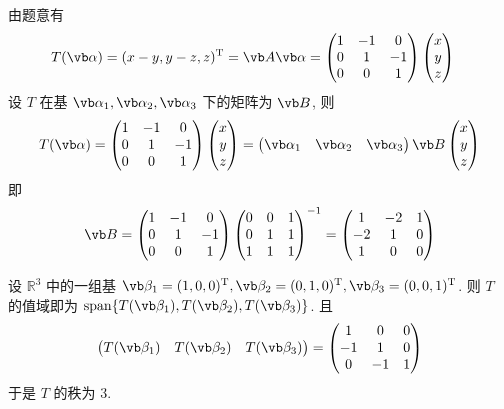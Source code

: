 由题意有
\[
\begin{aligned}
T(\vb\alpha)=(x-y,y-z,z)^{\mathrm T}&=\vb A\vb\alpha=\begin{pmatrix}1&-1&0\\ 0&1&-1\\ 0&0&1\end{pmatrix}\begin{pmatrix}x\\y\\z\end{pmatrix}
\end{aligned}
\]
设 $T$ 在基 $\vb\alpha_1,\vb\alpha_2,\vb\alpha_3$ 下的矩阵为 $\vb B$, 则
\[
	\begin{aligned}
T(\vb\alpha)=\begin{pmatrix}1&-1&0\\ 0&1&-1\\ 0&0&1\end{pmatrix}\begin{pmatrix}x\\y\\z\end{pmatrix}=\begin{pmatrix}\vb\alpha_1&\vb\alpha_2&\vb\alpha_3\end{pmatrix}\vb B\begin{pmatrix}x\\y\\z\end{pmatrix}
	\end{aligned}
\]
即
\[
	\vb B=\begin{pmatrix}1&-1&0\\ 0&1&-1\\ 0&0&1\end{pmatrix}\begin{pmatrix}0&0&1\\ 0&1&1\\ 1&1&1\end{pmatrix}^{-1}=\begin{pmatrix}1&-2&1\\ -2&1&0\\ 1&0&0\end{pmatrix}
\]

设 $\mathbb{R}^3$ 中的一组基 $\vb\beta_1=(1,0,0)^{\mathrm T},\vb\beta_2=(0,1,0)^{\mathrm T},\vb\beta_3=(0,0,1)^{\mathrm T}$. 则 $T$ 的值域即为 $\mathrm{span}\{T(\vb\beta_1),T(\vb\beta_2),T(\vb\beta_3)\}$. 且
\[
	\begin{pmatrix}T(\vb\beta_1)&T(\vb\beta_2)&T(\vb\beta_3)\end{pmatrix}=\begin{pmatrix}1&0&0\\ -1&1&0\\ 0&-1&1\end{pmatrix}
\] 
于是 $T$ 的秩为 $3$.